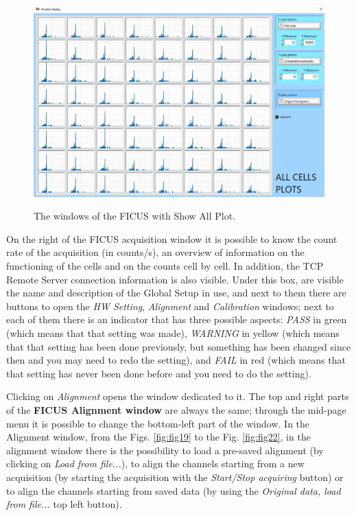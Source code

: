 \documentclass[a4paper,12pt,oneside,pdflatex,italian,final,twocolumn]{article}
\begin{document}
\begin{figure}[h]
\centering
{\includegraphics[width=.82\textwidth]{Capture41.jpg}} \quad
\caption{The windows of the FICUS with Show All Plot.}\label{fig:fig28}
\end{figure}


\clearpage

On the right of the FICUS acquisition window it is possible to know the count rate of the acquisition (in counts/s), an overview of information on the functioning of the cells and on the counts cell by cell. In addition, the TCP Remote Server connection information is also visible. Under this box, are visible the name and description of the Global Setup in use, and next to them there are buttons to open the \textit{HW Setting}, \textit{Alignment} and \textit{Calibration} windows; next to each of them there is an indicator that has three possible aspects: \textit{PASS} in green (which means that that setting was made), \textit{WARNING} in yellow (which means that that setting has been done previously, but something has been changed since then and you may need to redo the setting), and \textit{FAIL} in red (which means that that setting has never been done before and you need to do the setting).

Clicking on \textit{Alignment} opens the window dedicated to it. The top and right parts of the \textbf{FICUS Alignment window} are always the same; through the mid-page menu it is possible to change the bottom-left part of the window.
In the Alignment window, from the Figs. \ref{fig:fig19} to the Fig. \ref{fig:fig22}, in the alignment window there is the possibility to load a pre-saved alignment (by clicking on \textit{Load from file...}), to align the channels starting from a new acquisition (by starting the acquisition with the \textit{Start/Stop acquiring} button) or to align the channels starting from saved data (by using the \textit{Original data, load from file...} top left button).
\end{document}
